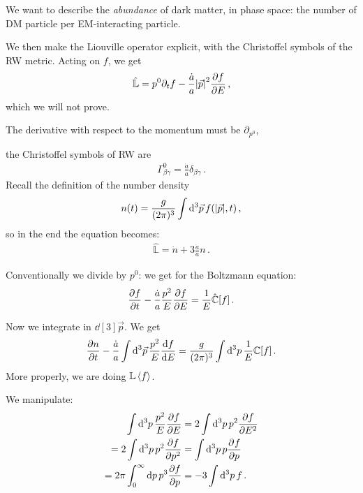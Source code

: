 \documentclass[main.tex]{subfiles}
\begin{document}
We want to describe the \emph{abundance} of dark matter, in phase space: the number of DM particle per EM-interacting particle. 

We then make the Liouville operator explicit, with the Christoffel symbols of the RW metric. Acting on \(f\), we get 
%
\begin{align}
  \hat{\mathbb{L}}  = p^{0} \partial_t f - \frac{\dot{a}}{a} \abs{\vec{p}}^2 \pdv{f}{E}
\,,
\end{align}
%
which we will not prove. 

The derivative with respect to the momentum must be \(\partial_{p^{0}}\),


the Christoffel symbols of RW are 
%
\begin{align}
  \Gamma^{0}_{\beta \gamma } = \frac{\dot{a}}{a} \delta_{\beta \gamma }
\,.
\end{align}
%
Recall the definition of the number density 
%
\begin{align}
  n(t) = \frac{g}{(2\pi )^3} \int  \dd[3]{\vec{p}} f(\abs{\vec{p}}, t) 
\,,
\end{align}
%
so in the end the equation becomes: 
%
\begin{align}
  \hat{\mathbb{L}} = \dot{n} + 3 \frac{\dot{a}}{a} n 
\,. 
\end{align}
%

Conventionally we divide by \(p^{0}\): we get for the Boltzmann equation: 
%
\begin{align}
  \pdv{f}{t} - \frac{\dot{a}}{a } \frac{p^2}{E} \pdv{f}{E} = \frac{1}{E} \hat{\mathbb{C}} [f]
\,.
\end{align}

Now we integrate in \(\dd[3]{\vec{p}}\). We get 
%
\begin{align}
  \pdv{n}{t} - \frac{\dot{a}}{a } \int  \dd[3]{\vec{p}} \frac{p^2}{E} \dv{f}{E} = \frac{g }{(2\pi )^3} \int  \dd[3]{p} \frac{1}{E} \mathbb{C} [f]  
\,.
\end{align}
%
More properly, we are doing \(\mathbb{L} \expval{f}\). 

We manipulate: 
%
\begin{subequations}
\begin{align}
  \int \dd[3]{p} \frac{p^2}{E} \pdv{f}{E} 
  &= 2 \int \dd[3]{p} p^2 \pdv{f}{E^2} \\
  = 2 \int \dd[3]{p} p^2 \pdv{f}{p^2} 
  &= \int \dd[3]{p} p \pdv[]{f}{p} \\
  = 2 \pi \int_{0}^{ \infty } \dd{p} p^3 \pdv{f}{p} 
  &= -3 \int \dd[3]{p} f
\,.
\end{align}
\end{subequations}
%
\end{document}
